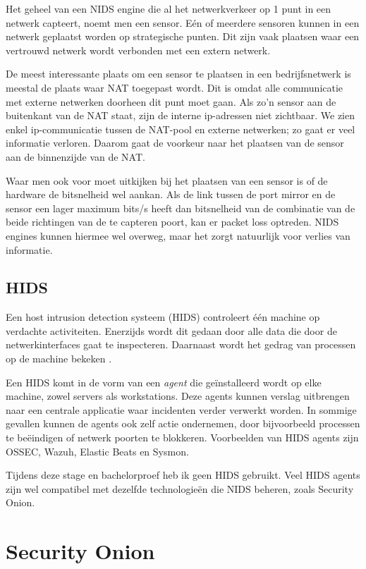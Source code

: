 \documentclass[a4paper, 12pt]{report}
\begin{document}
Het geheel van een NIDS engine die al het netwerkverkeer op 1 punt in een netwerk capteert, noemt men een sensor.
Eén of meerdere sensoren kunnen in een netwerk geplaatst worden op strategische punten.
Dit zijn vaak plaatsen waar een vertrouwd netwerk wordt verbonden met een extern netwerk.

De meest interessante plaats om een sensor te plaatsen in een bedrijfsnetwerk is meestal de plaats waar NAT toegepast wordt.
Dit is omdat alle communicatie met externe netwerken doorheen dit punt moet gaan.
Als zo'n sensor aan de buitenkant van de NAT staat, zijn de interne ip-adressen niet zichtbaar.
We zien enkel ip-communicatie tussen de NAT-pool en externe netwerken; zo gaat er veel informatie verloren.
Daarom gaat de voorkeur naar het plaatsen van de sensor aan de binnenzijde van de NAT.

Waar men ook voor moet uitkijken bij het plaatsen van een sensor is of de hardware de bitsnelheid wel aankan.
Als de link tussen de port mirror en de sensor een lager maximum bits/s heeft dan bitsnelheid van de combinatie van de beide richtingen van de te capteren poort, kan er packet loss optreden.
NIDS engines kunnen hiermee wel overweg, maar het zorgt natuurlijk voor verlies van informatie.

\section{HIDS}
Een host intrusion detection systeem (HIDS) controleert één machine op verdachte activiteiten.
Enerzijds wordt dit gedaan door alle data die door de netwerkinterfaces gaat te inspecteren.
Daarnaast wordt het gedrag van processen op de machine bekeken \autocite{wikipedia:hids}.

Een HIDS komt in de vorm van een \emph{agent} die geïnstalleerd wordt op elke machine, zowel servers als workstations.
Deze agents kunnen verslag uitbrengen naar een centrale applicatie waar incidenten verder verwerkt worden.
In sommige gevallen kunnen de agents ook zelf actie ondernemen, door bijvoorbeeld processen te beëindigen of netwerk poorten te blokkeren.
Voorbeelden van HIDS agents zijn OSSEC, Wazuh, Elastic Beats en Sysmon.

Tijdens deze stage en bachelorproef heb ik geen HIDS gebruikt.
Veel HIDS agents zijn wel compatibel met dezelfde technologieën die NIDS beheren, zoals Security Onion.

\chapter{Security Onion}
\end{document}
